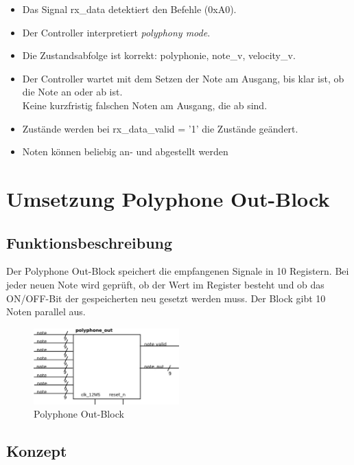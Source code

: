 \begin{itemize}
	\item Das Signal rx\_data detektiert den Befehle (0xA0).
	\item Der Controller interpretiert  \textit{polyphony mode}. 
	\item Die Zustandsabfolge ist korrekt: polyphonie, note\_v, velocity\_v.
	\item Der Controller wartet mit dem Setzen der Note am Ausgang, bis klar ist, ob die Note an oder ab ist.\\
	Keine kurzfristig falschen Noten am Ausgang, die ab sind.
	\item Zustände werden bei rx\_data\_valid = '1' die Zustände geändert.
	\item Noten können beliebig an- und abgestellt werden
\end{itemize}

\section{Umsetzung Polyphone Out-Block}\label{sect.polyphonie_umsetzung}
 
\subsection{Funktionsbeschreibung}

Der Polyphone Out-Block speichert die empfangenen Signale in 10 Registern. Bei jeder neuen Note wird geprüft, ob der Wert im Register besteht und ob das ON/OFF-Bit der gespeicherten neu gesetzt werden muss. Der Block gibt 10 Noten parallel aus.

\begin{figure}[H]
	\includegraphics[width=0.5\textwidth]{images/midi_interface/polyphonie_blockschaltbild.png}
	\caption{Polyphone Out-Block}
	\label{fig.polyphnie_out_block}
\end{figure}

\subsection{Konzept}\label{konzept_plyphonie}

